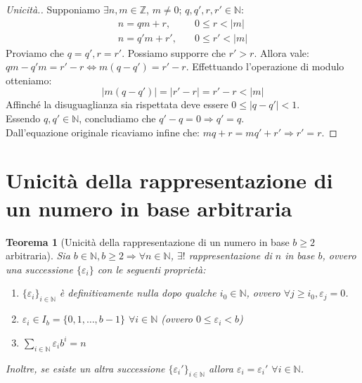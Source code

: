 \documentclass[12pt]{article}
\newcommand{\N}{\mathbb{N}}
\newcommand{\Z}{\mathbb{Z}}
\newcommand{\sesolose}{\Leftrightarrow}
\newcommand{\implica}{\Longrightarrow}
\newcommand{\nin}{\forall n\in\N}
\newcommand{\eps}{\varepsilon}
\newtheorem{theorem}{Teorema}
\begin{document}
\begin{proof}[Unicità.]
	Supponiamo $\exists n, m \in \Z$, $m \ne 0$; $q, q', r, r' \in \N$:
	\begin{align*}
		n = qm + r,   & \quad 0 \le r < |m|  \\
		n = q'm + r', & \quad 0 \le r' < |m|
	\end{align*}
	Proviamo che $ q = q', r = r'$. Possiamo supporre che $r' > r$. Allora vale:
	\\$ qm - q'm = r' - r \sesolose m(q-q') = r'-r$. Effettuando l'operazione di modulo otteniamo:
	$$ |m(q-q')| = |r' - r| = r' - r < |m|$$
	Affinché la disuguaglianza sia rispettata deve essere $ 0 \le |q-q'| < 1 $.
	\\ Essendo $q, q' \in \N$, concludiamo che $q' - q = 0 \implica q' = q$.
	\\ Dall'equazione originale ricaviamo infine che: $mq + r = mq' + r' \implica r' = r$.
\end{proof}

\section{Unicità della rappresentazione di un numero in base arbitraria}
\begin{theorem}[Unicità della rappresentazione di un numero in base $b \ge 2$ arbitraria]
	Sia $b \in \N, b \ge 2 \implica \nin$, $\exists!$ rappresentazione di $n$ in base $b$, ovvero una successione $\{\eps_{i}\}$ con le seguenti proprietà:
	\begin{enumerate}
		\item $\{\eps_i\}_{i\in\N}$ è definitivamente nulla dopo qualche $i_{0}\in\N$, ovvero $\forall j \ge i_{0}, \eps_{j} = 0$.
		\item $\eps_i \in I_b = \{0, 1,\ldots ,b-1\}$ $\forall i \in \N$ (ovvero $0 \le \eps_i < b$)
		\item $\displaystyle\sum_{i\in\N} \eps_{i}b^i = n$
	\end{enumerate}
	Inoltre, se esiste un altra successione $\{\eps_i'\}_{i\in\N}$ allora $\eps_i = \eps_{i}'$ $\forall i \in \N$.
\end{theorem}
\end{document}
